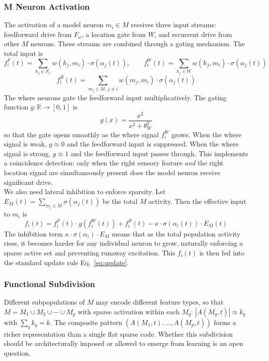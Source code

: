 \documentclass[11pt]{article}
\begin{document}
\subsubsection{M Neuron Activation}
The activation of a model neuron $m_i \in M$ receives three input streams: feedforward drive from $F_\omega$, a location gate from $W$, and recurrent drive from other $M$ neurons. These streams are combined through a gating mechanism. The total input is
\begin{equation}
    f_i^F(t) = \sum_{h_j \in F_\omega} w(h_j, m_i) \cdot \sigma(\alpha_j(t)), \qquad f_i^W(t) = \sum_{h_j \in W} w(h_j, m_i) \cdot \sigma(\alpha_j(t))
\end{equation}
\begin{equation}
    f_i^R(t) = \sum_{m_j \in M,\, j \ne i} w(m_j, m_i) \cdot \sigma(\alpha_j(t))
\end{equation}
The where neurons gate the feedforward input multiplicatively. The gating function $g: \mathbb{R} \to [0,1]$ is
\begin{equation}
    g(x) = \frac{x^2}{x^2 + \theta_W^2}
\end{equation}
so that the gate opens smoothly as the where signal $f_i^W$ grows. When the where signal is weak, $g \approx 0$ and the feedforward input is suppressed. When the where signal is strong, $g \approx 1$ and the feedforward input passes through. This implements a coincidence detection: only when the right sensory feature \textit{and} the right location signal are simultaneously present does the model neuron receive significant drive.\\

We also need lateral inhibition to enforce sparsity. Let $E_M(t) = \sum_{m_j \in M} \sigma(\alpha_j(t))$ be the total $M$ activity. Then the effective input to $m_i$ is
\begin{equation}\label{eq:m_input}
    f_i(t) = f_i^F(t) \cdot g(f_i^W(t)) + f_i^R(t) - \kappa \cdot \sigma(\alpha_i(t)) \cdot E_M(t)
\end{equation}
The inhibition term $\kappa \cdot \sigma(\alpha_i) \cdot E_M$ means that as the total population activity rises, it becomes harder for any individual neuron to grow, naturally enforcing a sparse active set and preventing runaway excitation. This $f_i(t)$ is then fed into the standard update rule Eq.~\eqref{eq:update}.

\subsubsection{Functional Subdivision}
Different subpopulations of $M$ may encode different feature types, so that $M = M_1 \cup M_2 \cup \cdots \cup M_p$ with sparse activation within each $M_q$: $|A(M_q, t)| \approx k_q$ with $\sum_q k_q = k$. The composite pattern $(A(M_1, t), \ldots, A(M_p, t))$ forms a richer representation than a single flat sparse code. Whether this subdivision should be architecturally imposed or allowed to emerge from learning is an open question.
\end{document}
